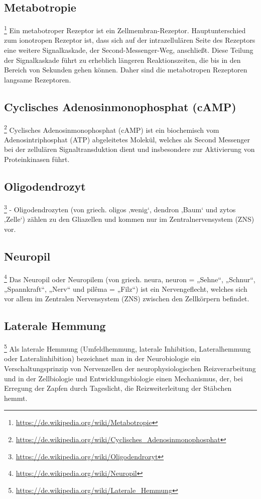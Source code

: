 \subsection{Metabotropie}\footnote{\url{https://de.wikipedia.org/wiki/Metabotropie}}
Ein metabotroper Rezeptor ist ein Zellmembran-Rezeptor. Hauptunterschied zum ionotropen Rezeptor ist, dass sich auf der intrazellulären Seite des Rezeptors eine weitere Signalkaskade, der Second-Messenger-Weg, anschließt. Diese Teilung der Signalkaskade führt zu erheblich längeren Reaktionszeiten, die bis in den Bereich von Sekunden gehen können. Daher sind die metabotropen Rezeptoren langsame Rezeptoren.

\subsection{Cyclisches Adenosinmonophosphat (cAMP)}\footnote{\url{https://de.wikipedia.org/wiki/Cyclisches_Adenosinmonophosphat}}
Cyclisches Adenosinmonophosphat (cAMP) ist ein biochemisch vom Adenosintriphosphat (ATP) abgeleitetes Molekül, welches als Second Messenger bei der zellulären Signaltransduktion dient und insbesondere zur Aktivierung von Proteinkinasen führt.

\subsection{Oligodendrozyt}\footnote{\url{https://de.wikipedia.org/wiki/Oligodendrozyt}}
 - Oligodendrozyten (von griech. oligos ‚wenig‘, dendron ‚Baum‘ und zytos ‚Zelle‘) zählen zu den Gliazellen und kommen nur im Zentralnervensystem (ZNS) vor.

\subsection{Neuropil}\footnote{\url{https://de.wikipedia.org/wiki/Neuropil}}
Das Neuropil oder Neuropilem (von griech. neura, neuron = „Sehne“, „Schnur“, „Spannkraft“, „Nerv“ und pilêma = „Filz“) ist ein Nervengeflecht, welches sich vor allem im Zentralen Nervensystem (ZNS) zwischen den Zellkörpern befindet.

\subsection{Laterale Hemmung}\footnote{\url{https://de.wikipedia.org/wiki/Laterale_Hemmung}}
Als laterale Hemmung (Umfeldhemmung, laterale Inhibition, Lateralhemmung oder Lateralinhibition) bezeichnet man in der Neurobiologie ein Verschaltungsprinzip von Nervenzellen der neurophysiologischen Reizverarbeitung und in der Zellbiologie und Entwicklungsbiologie einen Mechanismus, der, bei Erregung der Zapfen durch Tageslicht, die Reizweiterleitung der Stäbchen hemmt.

